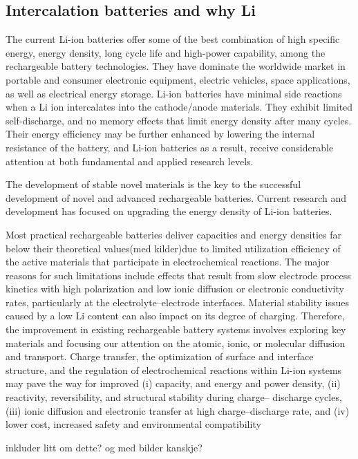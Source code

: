 \subsection{Intercalation batteries and why Li}
The current Li-ion batteries offer some of the best combination of high specific energy, energy density, long cycle life and high-power capability, among the rechargeable battery technologies. They have dominate the worldwide market in portable and consumer electronic equipment, electric vehicles, space applications, as well as electrical energy storage. Li-ion batteries have minimal side reactions when a Li ion intercalates into the cathode/anode materials. They exhibit limited self-discharge, and no memory effects that limit energy density after many cycles. Their energy efficiency may be further enhanced by lowering the internal resistance of the battery, and Li-ion batteries as a result, receive considerable attention at both fundamental and applied research levels.


The development of stable novel materials is the key to the successful development of novel and advanced rechargeable batteries. Current research and development has focused on upgrading the energy density of Li-ion batteries. 

Most practical
rechargeable batteries deliver capacities and energy densities
far below their theoretical values(med kilder)due to limited utilization
efficiency of the active materials that participate in electrochemical reactions. The major reasons for such limitations
include effects that result from slow electrode process kinetics
with high polarization and low ionic diffusion or electronic
conductivity rates, particularly at the electrolyte–electrode interfaces. Material stability issues caused by a low Li content can
also impact on its degree of charging. Therefore, the improvement
in existing rechargeable battery systems involves exploring key
materials and focusing our attention on the atomic, ionic, or
molecular diffusion and transport. Charge transfer, the optimization of surface and interface structure, and the regulation of
electrochemical reactions within Li-ion systems may pave the
way for improved (i) capacity, and energy and power density,
(ii) reactivity, reversibility, and structural stability during charge–
discharge cycles, (iii) ionic diffusion and electronic transfer at
high charge–discharge rate, and (iv) lower cost, increased safety
and environmental compatibility


inkluder litt om dette? og med bilder kanskje?

